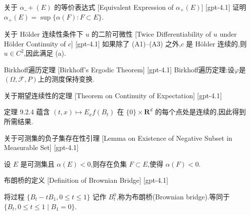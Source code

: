 \documentclass[UTF8]{ctexart}
\begin{document}
    
    
    \begin{thm}
        {关于 $\alpha\_{+}(E)$ 的等价表达式}
        [Equivalent Expression of $\alpha_{+}(E)$]
        [gpt-4.1]
        证明 $\alpha_{+}(E) = \operatorname*{sup}\{\alpha(F) : F \subset E\}$.
    \end{thm}
    
    
    
    \begin{thm}
        {关于 Hölder 连续性条件下 $
    u$ 的二阶可微性}
        [Twice Differentiability of $
    u$ under Hölder Continuity of $c$]
        [gpt-4.1]
        如果除了 (A1)–(A3) 之外,$c$ 是 Hölder 连续的,则 $
u \in C^{2}$,因此满足 (a).
    \end{thm}
    
    
    
    \begin{thm}
        {Birkhoff遍历定理}
        [Birkhoff's Ergodic Theorem]
        [gpt-4.1]
        Birkhoff遍历定理:设$\varphi$是$(\Omega, \mathcal{F}, P)$上的测度保持变换.
    \end{thm}
    
    
    
    \begin{thm}
        {关于期望连续性的定理}
        [Theorem on Continuity of Expectation]
        [gpt-4.1]
        
定理 9.2.4 蕴含 $(t, x) \mapsto E_{x} f(B_{t})$ 在 $\{ 0 \} \times \mathbf{R}^{d}$ 的每个点处是连续的,因此得到所需结果.

    \end{thm}
    
    
    
    \begin{lma}
        {关于可测集的负子集存在性引理}
        [Lemma on Existence of Negative Subset in Measurable Set]
        [gpt-4.1]
        
设 $E$ 是可测集且 $\alpha(E) < 0$,则存在负集 $F \subset E$,使得 $\alpha(F) < 0$.

    \end{lma}
    
    
    
    \begin{dfn}
        {布朗桥的定义}
        [Definition of Brownian Bridge]
        [gpt-4.1]
        
将过程 $\{ B_{t} - t B_{1}, 0 \le t \le 1 \}$ 记作 $B_{t}^{0}$,称为布朗桥(Brownian bridge).等同于 $\{ B_{t}, 0 \le t \le 1 \mid B_{1} = 0 \}$.

    \end{dfn}
    
\end{document}
